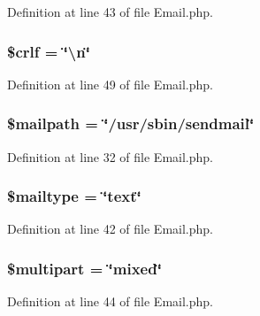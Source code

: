 Definition at line 43 of file Email.\-php.

\hypertarget{class_c_i___email_a85554ab78e9a915b4299dd3f1d5c2866}{
\subsubsection[{\$crlf}]{\setlength{\rightskip}{0pt plus 5cm}\$crlf = \char`\"{}\textbackslash{}n\char`\"{}}}\label{class_c_i___email_a85554ab78e9a915b4299dd3f1d5c2866}


Definition at line 49 of file Email.\-php.

\hypertarget{class_c_i___email_a23dd98b1852b9e73c20292b2cc96b20f}{
\subsubsection[{\$mailpath}]{\setlength{\rightskip}{0pt plus 5cm}\$mailpath = \char`\"{}/usr/sbin/sendmail\char`\"{}}}\label{class_c_i___email_a23dd98b1852b9e73c20292b2cc96b20f}


Definition at line 32 of file Email.\-php.

\hypertarget{class_c_i___email_a7f4dd7af7642585306869f8985ab744f}{
\subsubsection[{\$mailtype}]{\setlength{\rightskip}{0pt plus 5cm}\$mailtype = \char`\"{}text\char`\"{}}}\label{class_c_i___email_a7f4dd7af7642585306869f8985ab744f}


Definition at line 42 of file Email.\-php.

\hypertarget{class_c_i___email_adc885f76d89c0c495bea0488f29c3104}{
\subsubsection[{\$multipart}]{\setlength{\rightskip}{0pt plus 5cm}\$multipart = \char`\"{}mixed\char`\"{}}}\label{class_c_i___email_adc885f76d89c0c495bea0488f29c3104}


Definition at line 44 of file Email.\-php.

